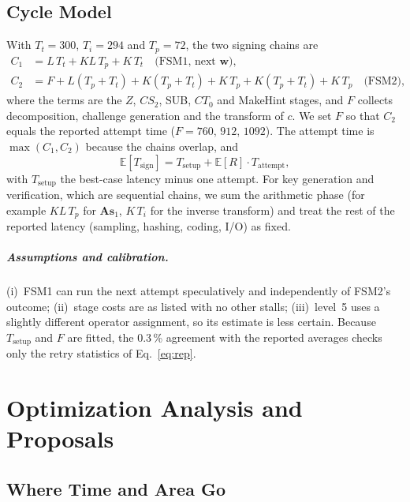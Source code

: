 \documentclass[12pt,a4paper]{report}
\begin{document}
\section{Cycle Model}\label{sec:model}
With $T_t=300$, $T_i=294$ and $T_p=72$, the two signing chains are
\begin{align}
  C_1 &= L\,T_t + KL\,T_p + K\,T_t \quad\text{(FSM1, next }\mathbf{w}\text{)},\\
  C_2 &= F + L(T_p{+}T_t) + K(T_p{+}T_t) + K\,T_p + K(T_p{+}T_t) + K\,T_p \quad\text{(FSM2)},
\end{align}
where the terms are the $Z$, $CS_2$, SUB, $CT_0$ and MakeHint stages, and $F$ collects decomposition, challenge generation and the transform of $c$. We set $F$ so that $C_2$ equals the reported attempt time ($F=760,\,912,\,1092$). The attempt time is $\max(C_1,C_2)$ because the chains overlap, and
\begin{equation}
  \mathbb{E}[T_{\text{sign}}]=T_{\text{setup}}+\mathbb{E}[R]\cdot T_{\text{attempt}},
  \label{eq:sign}
\end{equation}
with $T_{\text{setup}}$ the best-case latency minus one attempt. For key generation and verification, which are sequential chains, we sum the arithmetic phase (for example $KL\,T_p$ for $\mathbf{A}\mathbf{s}_1$, $K\,T_i$ for the inverse transform) and treat the rest of the reported latency (sampling, hashing, coding, I/O) as fixed.

\paragraph{Assumptions and calibration.}
(i)~FSM1 can run the next attempt speculatively and independently of FSM2's outcome; (ii)~stage costs are as listed with no other stalls; (iii)~level~5 uses a slightly different operator assignment, so its estimate is less certain. Because $T_{\text{setup}}$ and $F$ are fitted, the 0.3\,\% agreement with the reported averages checks only the retry statistics of Eq.~\eqref{eq:rep}.

\chapter{Optimization Analysis and Proposals}
\section{Where Time and Area Go}
\end{document}
